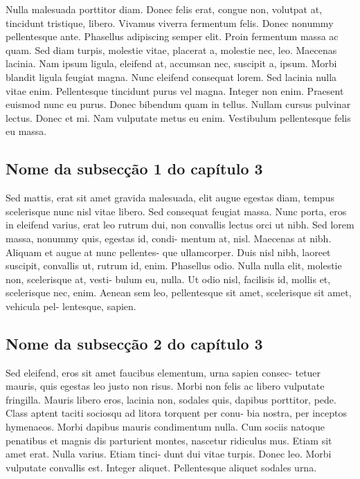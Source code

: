 Nulla malesuada porttitor diam. Donec felis erat, congue non, volutpat at, tincidunt tristique, libero. Vivamus viverra fermentum felis. Donec nonummy pellentesque ante. Phasellus adipiscing semper elit. Proin fermentum massa ac quam. Sed diam turpis, molestie vitae, placerat a, molestie nec, leo. Maecenas lacinia. Nam ipsum ligula, eleifend at, accumsan nec, suscipit a, ipsum. Morbi blandit ligula feugiat magna. Nunc eleifend consequat lorem. Sed lacinia nulla vitae enim. Pellentesque tincidunt purus vel magna. Integer non enim. Praesent euismod nunc eu purus. Donec bibendum quam in tellus. Nullam cursus pulvinar lectus. Donec et mi. Nam vulputate metus eu enim. Vestibulum pellentesque felis eu massa.

\subsection{Nome da subsecção 1 do capítulo 3}
Sed mattis, erat sit amet gravida malesuada, elit augue egestas diam, tempus scelerisque nunc nisl vitae libero. Sed consequat feugiat massa. Nunc porta, eros in eleifend varius, erat leo rutrum dui, non convallis lectus orci ut nibh. Sed lorem massa, nonummy quis, egestas id, condi- mentum at, nisl. Maecenas at nibh. Aliquam et augue at nunc pellentes- que ullamcorper. Duis nisl nibh, laoreet suscipit, convallis ut, rutrum id, enim. Phasellus odio. Nulla nulla elit, molestie non, scelerisque at, vesti- bulum eu, nulla. Ut odio nisl, facilisis id, mollis et, scelerisque nec, enim. Aenean sem leo, pellentesque sit amet, scelerisque sit amet, vehicula pel- lentesque, sapien.

\subsection{Nome da subsecção 2 do capítulo 3}
Sed eleifend, eros sit amet faucibus elementum, urna sapien consec- tetuer mauris, quis egestas leo justo non risus. Morbi non felis ac libero vulputate fringilla. Mauris libero eros, lacinia non, sodales quis, dapibus porttitor, pede. Class aptent taciti sociosqu ad litora torquent per conu- bia nostra, per inceptos hymenaeos. Morbi dapibus mauris condimentum nulla. Cum sociis natoque penatibus et magnis dis parturient montes, nascetur ridiculus mus. Etiam sit amet erat. Nulla varius. Etiam tinci- dunt dui vitae turpis. Donec leo. Morbi vulputate convallis est. Integer aliquet. Pellentesque aliquet sodales urna.

